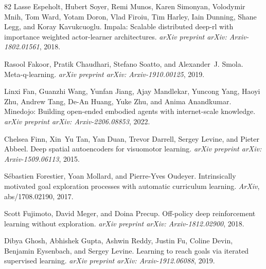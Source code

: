 \documentclass{article}
\begin{document}
\begin{thebibliography}{82}
Lasse Espeholt, Hubert Soyer, Remi Munos, Karen Simonyan, Volodymir Mnih, Tom Ward, Yotam Doron, Vlad Firoiu, Tim Harley, Iain Dunning, Shane Legg, and Koray Kavukcuoglu.
\newblock Impala: Scalable distributed deep-rl with importance weighted actor-learner architectures.
\newblock \emph{arXiv preprint arXiv: Arxiv-1802.01561}, 2018.

Rasool Fakoor, Pratik Chaudhari, Stefano Soatto, and Alexander~J. Smola.
\newblock Meta-q-learning.
\newblock \emph{arXiv preprint arXiv: Arxiv-1910.00125}, 2019.

Linxi Fan, Guanzhi Wang, Yunfan Jiang, Ajay Mandlekar, Yuncong Yang, Haoyi Zhu, Andrew Tang, De-An Huang, Yuke Zhu, and Anima Anandkumar.
\newblock Minedojo: Building open-ended embodied agents with internet-scale knowledge.
\newblock \emph{arXiv preprint arXiv: Arxiv-2206.08853}, 2022.

Chelsea Finn, Xin~Yu Tan, Yan Duan, Trevor Darrell, Sergey Levine, and Pieter Abbeel.
\newblock Deep spatial autoencoders for visuomotor learning.
\newblock \emph{arXiv preprint arXiv: Arxiv-1509.06113}, 2015.

S{\'e}bastien Forestier, Yoan Mollard, and Pierre-Yves Oudeyer.
\newblock Intrinsically motivated goal exploration processes with automatic curriculum learning.
\newblock \emph{ArXiv}, abs/1708.02190, 2017.

Scott Fujimoto, David Meger, and Doina Precup.
\newblock Off-policy deep reinforcement learning without exploration.
\newblock \emph{arXiv preprint arXiv: Arxiv-1812.02900}, 2018.

Dibya Ghosh, Abhishek Gupta, Ashwin Reddy, Justin Fu, Coline Devin, Benjamin Eysenbach, and Sergey Levine.
\newblock Learning to reach goals via iterated supervised learning.
\newblock \emph{arXiv preprint arXiv: Arxiv-1912.06088}, 2019.


\end{thebibliography}
\end{document}
